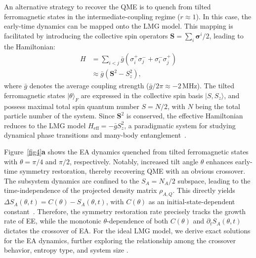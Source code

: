 \documentclass[reprint,superscriptaddress,preprintnumbers,longbibliography,
amsmath,amssymb,aps,floatfix,pra,twocolumn, tightenlines %
]{revtex4-2}
\begin{document}
    An alternative strategy to recover the QME is to quench from tilted ferromagnetic states in the intermediate-coupling regime (\( r \approx 1 \)). In this case, the early-time dynamics can be mapped onto the LMG model. This mapping is facilitated by introducing the collective spin operators \( \boldsymbol{S} = \sum_i \boldsymbol{\sigma}^i / 2 \), leading to the Hamiltonian:
    \begin{equation}
        \begin{aligned}
        H &= \sum_{i< j} \bar{g} (\sigma_i^+ \sigma_j^- + \sigma_i^- \sigma_j^+ ) \\
        &\approx \bar{g}(\boldsymbol{S}^2 - S_z^2),
        \end{aligned} 
    \end{equation}  
    where $\bar{g}$ denotes the average coupling strength (\(\bar{g}/2\pi \approx -2 \, \text{MHz}\)). The tilted ferromagnetic states \( |\theta\rangle_F \) are expressed in the collective spin basis \(|S, S_z\rangle\), and possess maximal total spin quantum number \(S = N/2\), with \( N \) being the total particle number of the system. 
    Since $\boldsymbol{S}^2$ is conserved, the effective Hamiltonian reduces to the LMG model \(H_{\text{eff}} = -\bar{g} S_z^2\), a paradigmatic system for studying dynamical phase transitions and many-body entanglement~\cite{2020_SA_xu}.

    Figure~\ref{fig4}\textbf{a} shows the EA dynamics quenched from tilted ferromagnetic states with $\theta = \pi/4$ and $\pi/2$, respectively. Notably, increased tilt angle $\theta$ enhances early-time symmetry restoration, thereby recovering QME with an obvious crossover. The subsystem dynamics are confined to the $S_A = N_A/2$ subspace, leading to the time-independence of the projected density matrix $\rho_{A,Q}$.
    This directly yields \(\Delta S_A(\theta,t) = C(\theta) - S_A(\theta,t)\), with $C(\theta)$ as an initial-state-dependent constant~\cite{supp_cite}. Therefore, the symmetry restoration rate precisely tracks the growth rate of EE, while the monotonic $\theta$-dependence of both $C(\theta)$ and $\partial_t S_A(\theta,t)$ dictates the crossover of EA. For the ideal LMG model, we derive exact solutions for the EA dynamics, further exploring the relationship among the crossover behavior, entropy type, and system size \cite{supp_cite}.
\end{document}
